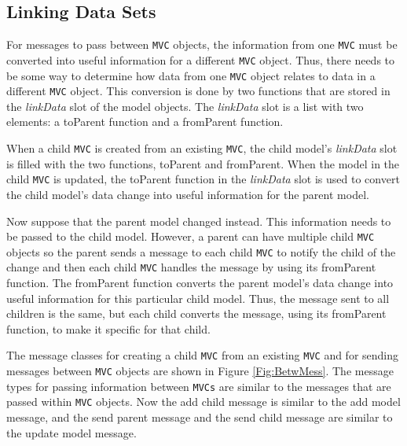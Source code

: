 \documentclass{article}[11pt]
\newcommand{\Rfunction}[1]{{\textsf{#1}}}
\newcommand{\Robject}[1]{{\texttt{#1}}}
\newcommand{\Rslot}[1]{\textsl{#1}}
\begin{document}
\subsection{Linking Data Sets}
\label{Ssec:MultLink}

For messages to pass between \Robject{MVC} objects, the information from one
\Robject{MVC} must be converted into useful information for a different
\Robject{MVC} object.  Thus, there needs to be some way to determine how data
from one \Robject{MVC} object relates to data in a different \Robject{MVC}
object.  This conversion is done by two functions that are stored in the
\Rslot{linkData} slot of the model objects.  The \Rslot{linkData}
slot is a list with two elements: a \Rfunction{toParent} function and a
\Rfunction{fromParent} function. 

When a child \Robject{MVC} is created from an existing \Robject{MVC}, the
child model's \Rslot{linkData} slot is filled with the two functions,
\Rfunction{toParent} and \Rfunction{fromParent}.  When the model in
the child \Robject{MVC} is updated, the \Rfunction{toParent} function in the
\Rslot{linkData} slot is used to convert the child model's data
change into useful information for the parent model.  

Now suppose that the parent model changed instead.  This information
needs to be passed to the child model.  However, a parent can have
multiple child \Robject{MVC} objects so the parent sends a message to
each child \Robject{MVC} to notify the child of the change and then
each child \Robject{MVC} handles the message by using its
\Rfunction{fromParent} function.  The \Rfunction{fromParent} function
converts the parent model's data change into useful information for
this particular child model.  Thus, the message sent to all children is the
same, but each child converts the message, using its \Rfunction{fromParent}
function, to make it specific for that child.

The message classes for creating a child \Robject{MVC} from an existing
\Robject{MVC} and for sending messages between \Robject{MVC} objects are shown
in Figure \ref{Fig:BetwMess}.  The message types for passing information
between \Robject{MVCs} are similar to the messages
that are passed within \Robject{MVC} objects.  Now the add child message is
similar to the add model message, and the send parent message and the send
child message are similar to the update model message.
\end{document}
